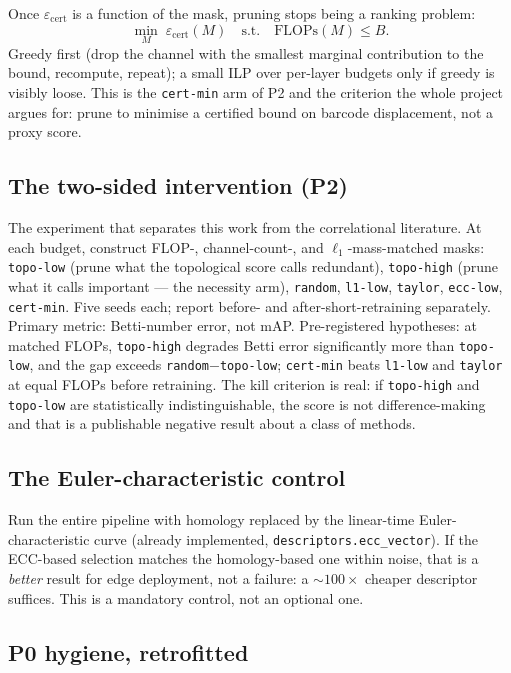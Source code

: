 \documentclass[11pt]{article}
\newcommand{\code}[1]{\texttt{\small #1}}
\newcommand{\epscert}{\varepsilon_{\mathrm{cert}}}
\theoremstyle{definition}
\theoremstyle{plain}
\begin{document}
Once $\epscert$ is a function of the mask, pruning stops being a ranking problem:
\[
\min_M \; \epscert(M) \quad \text{s.t.} \quad \mathrm{FLOPs}(M) \le B .
\]
Greedy first (drop the channel with the smallest marginal contribution to the
bound, recompute, repeat); a small ILP over per-layer budgets only if greedy is
visibly loose. This is the \code{cert-min} arm of P2 and the criterion the whole
project argues for: prune to minimise a certified bound on barcode displacement,
not a proxy score.

\subsection{The two-sided intervention (P2)}

The experiment that separates this work from the correlational literature. At
each budget, construct FLOP-, channel-count-, and $\ell_1$-mass-matched masks:
\code{topo-low} (prune what the topological score calls redundant), \code{topo-high}
(prune what it calls important --- the necessity arm), \code{random},
\code{l1-low}, \code{taylor}, \code{ecc-low}, \code{cert-min}. Five seeds each;
report before- and after-short-retraining separately. Primary metric:
Betti-number error, not mAP. Pre-registered hypotheses: at matched FLOPs,
\code{topo-high} degrades Betti error significantly more than \code{topo-low},
and the gap exceeds \code{random}$-$\code{topo-low}; \code{cert-min} beats
\code{l1-low} and \code{taylor} at equal FLOPs before retraining. The kill
criterion is real: if \code{topo-high} and \code{topo-low} are statistically
indistinguishable, the score is not difference-making and that is a publishable
negative result about a class of methods.

\subsection{The Euler-characteristic control}

Run the entire pipeline with homology replaced by the linear-time
Euler-characteristic curve (already implemented, \code{descriptors.ecc\_vector}).
If the ECC-based selection matches the homology-based one within noise, that is a
\emph{better} result for edge deployment, not a failure: a $\sim\!100\times$
cheaper descriptor suffices. This is a mandatory control, not an optional one.

\subsection{P0 hygiene, retrofitted}
\end{document}
